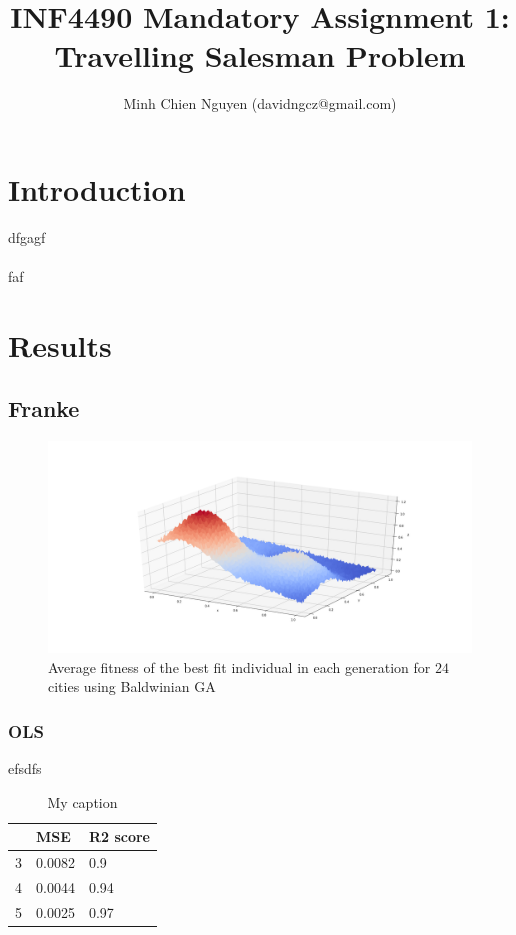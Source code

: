 \documentclass [11pt]{article}
\title{INF4490 Mandatory Assignment 1: \\ Travelling Salesman Problem}
\author{Minh Chien Nguyen (davidngcz@gmail.com)}
\begin{document}
\maketitle
\nocite{*}

\section{Introduction}
dfgagf\\
\\
faf
\section{Results}
\subsection{Franke}
\begin{figure}[H]
\centering
\includegraphics[width=1\textwidth]{figures/Franke.png}
        \caption{Average fitness of the best fit individual in each generation for $24$ cities using Baldwinian GA}
        \label{fig:Franke}
\end{figure}
\subsubsection{OLS}
efsdfs

\begin{table}[H]
\centering
\begin{tabular}{lll}
\hline
  & MSE    & R2 score \\ \hline
3 & 0.0082 & 0.9      \\
4 & 0.0044 & 0.94     \\
5 & 0.0025 & 0.97     \\ \hline
\end{tabular}%
\caption{My caption}
\label{my-label}
\end{table}
\end{document}
